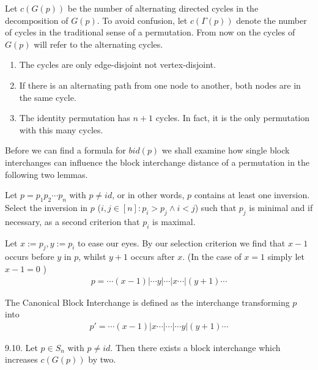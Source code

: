 \begin{definition}
Let $c(G(p))$ be the number of alternating directed cycles in the decomposition of $G(p)$. To avoid confusion, let $c(\Gamma (p))$ denote the number of cycles in the traditional sense of a permutation. From now on the cycles of $G(p)$ will refer to the alternating cycles.
\end{definition}

\begin{remark}

\begin{enumerate}
\item The cycles are only edge-disjoint not vertex-disjoint.
\item If there is an alternating path from one node to another, both nodes are in the same cycle.
\item The identity permutation has $n+1$ cycles. In fact, it is the only permutation with this many cycles.
\end{enumerate}
\end{remark}

Before we can find a formula for $bid(p)$ we shall examine how single block interchanges can influence the block interchange distance of a permutation in the following two lemmas.

\begin{definition} Let $p = p_1 p_2 \cdots p_n $ with $ p \neq id $, or in other words, $p$ contains at least one inversion. Select the inversion in $p$ ($ i,j \in [ n ] : p_i > p_j \wedge i < j$) such that $p_j$ is minimal and if necessary, as a second criterion that $p_i$ is maximal. 

Let $x := p_j , y := p_i$ to ease our eyes. By our selection criterion we find that $x-1$ occurs before $y$ in $p$, whilst $y+1$ occurs after $x$. (In the case of $x =1$ simply let $x-1=0$ )
\begin{align*}
p = \cdots (x-1) | \cdots y | \cdots | x \cdots | (y+1) \cdots
\end{align*}

The Canonical Block Interchange is defined as the interchange transforming $p$ into
\begin{align*}
p' = \cdots (x-1) | x \cdots | \cdots | \cdots y | (y+1) \cdots
\end{align*}

\end{definition}

\begin{lemma}
9.10. 
Let $p \in S_n$ with $p \neq id$. Then there exists a block interchange which increases $c(G(p))$ by two.
\end{lemma}

